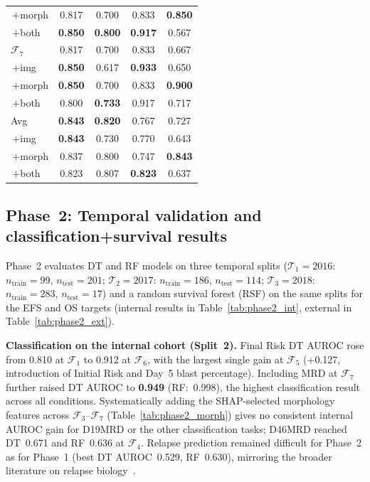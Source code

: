 \documentclass[pdflatex,sn-nature]{sn-jnl}
\begin{document}
\begin{table}[p]
\begin{tabular}{@{}l cccc@{}}
\;\,$+$morph         & 0.817 & 0.700 & 0.833 & \textbf{0.850} \\
\;\,$+$both          & \textbf{0.850} & \textbf{0.800} & \textbf{0.917} & 0.567 \\
\addlinespace[2pt]
$\mathcal{F}_7$      & 0.817 & 0.700 & 0.833 & 0.667 \\
\;\,$+$img           & \textbf{0.850} & 0.617 & \textbf{0.933} & 0.650 \\
\;\,$+$morph         & \textbf{0.850} & 0.700 & 0.833 & \textbf{0.900} \\
\;\,$+$both          & 0.800 & \textbf{0.733} & 0.917 & 0.717 \\
\addlinespace[2pt]
Avg & \textbf{0.843} & \textbf{0.820} & 0.767 & 0.727 \\
\;\,$+$img & \textbf{0.843} & 0.730 & 0.770 & 0.643 \\
\;\,$+$morph & 0.837 & 0.800 & 0.747 & \textbf{0.843} \\
\;\,$+$both & 0.823 & 0.807 & \textbf{0.823} & 0.637 \\
\bottomrule
\end{tabular}
\end{table}

\subsection{Phase~2: Temporal validation and classification+survival
results}
\label{sec:phase2}

Phase~2 evaluates DT and RF models on three temporal splits
($\mathcal{T}_1=2016$: $n_\text{train}=99$, $n_\text{test}=201$;
$\mathcal{T}_2=2017$: $n_\text{train}=186$, $n_\text{test}=114$;
$\mathcal{T}_3=2018$: $n_\text{train}=283$, $n_\text{test}=17$)
and a random survival forest (RSF) on the same splits for the EFS
and OS targets (internal results in Table~\ref{tab:phase2_int},
external in Table~\ref{tab:phase2_ext}).

\textbf{Classification on the internal cohort (Split~2).}
Final Risk DT AUROC rose from 0.810 at $\mathcal{F}_1$ to
0.912 at $\mathcal{F}_6$, with the largest single gain at $\mathcal{F}_5$
(+0.127, introduction of Initial Risk and Day~5 blast percentage).
Including MRD at $\mathcal{F}_7$ further raised DT AUROC to
\textbf{0.949} (RF:~0.998), the highest classification result across
all conditions.
Systematically adding the SHAP-selected morphology features across
$\mathcal{F}_3$--$\mathcal{F}_7$ (Table~\ref{tab:phase2_morph}) gives
no consistent internal AUROC gain for D19MRD or the other
classification tasks; D46MRD reached DT~0.671 and RF~0.636 at
$\mathcal{F}_4$.
Relapse prediction remained difficult for Phase~2 as for Phase~1
(best DT AUROC~0.529, RF~0.630), mirroring the broader literature
on relapse biology~\cite{[CITE:Martinez2025]}.
\end{document}
